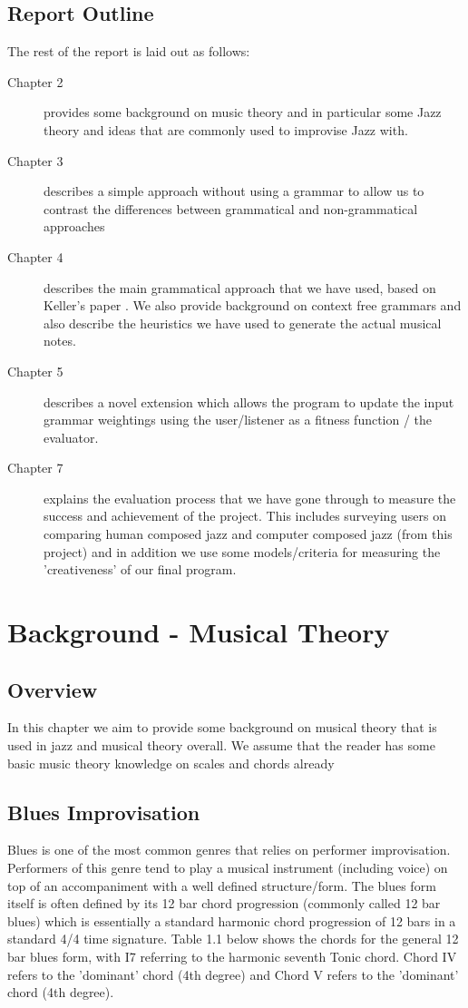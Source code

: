 \documentclass[pdftex,12pt,a4paper]{report}
\begin{document}
\section{Report Outline}
The rest of the report is laid out as follows:
\begin{description}
  \item[Chapter 2] provides some background on music theory and in particular some Jazz theory and ideas that are commonly used to improvise Jazz with.
  \item[Chapter 3] describes a simple approach without using a grammar to allow us to contrast the differences between grammatical and non-grammatical approaches
  \item[Chapter 4] describes the main grammatical approach that we have used, based on Keller's paper \cite{keller07}. We also provide background on context free grammars and also describe the heuristics we have used to generate the actual musical notes.
  \item[Chapter 5] describes a novel extension which allows the program to update the input grammar weightings using the user/listener as a fitness function / the evaluator.
  \item[Chapter 7] explains the evaluation process that we have gone through to measure the success and achievement of the project. This includes surveying users on comparing human composed jazz and computer composed jazz (from this project) and in addition we use some models/criteria for measuring the 'creativeness' of our final program.
\end{description}

\pagebreak

\chapter{Background - Musical Theory}

\section{Overview}
In this chapter we aim to provide some background on musical theory that is used in jazz and musical theory overall. We assume that the reader has some basic music theory knowledge on scales and chords already


\section{Blues Improvisation}
Blues is one of the most common genres that relies on performer improvisation. Performers of this genre tend to play a musical instrument (including voice) on top of an accompaniment with a well defined structure/form. The blues form itself is often defined by its 12 bar chord progression (commonly called 12 bar blues) which is essentially a standard harmonic chord progression of 12 bars in a standard 4/4 time signature. Table 1.1 below shows the chords for the general 12 bar blues form, with I7 referring to the harmonic seventh Tonic chord. Chord IV refers to the 'dominant' chord (4th degree) and Chord V refers to the 'dominant' chord (4th degree).
\end{document}
